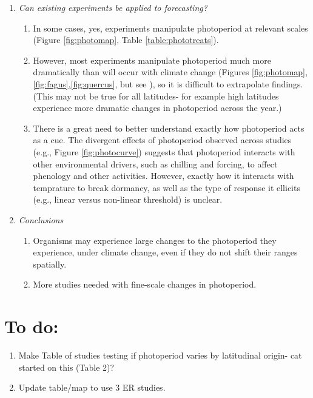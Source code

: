 \documentclass{article}
\begin{document}
\begin{enumerate}
\begin{enumerate}
\end{enumerate}
\item\textit{Can existing experiments be applied to forecasting?}
\begin{enumerate}
\item In some cases, yes, experiments manipulate photoperiod at relevant scales (Figure \ref{fig:photomap}, Table \ref{table:phototreats}).
\item However, most experiments manipulate photoperiod much more dramatically than will occur with climate change (Figures \ref{fig:photomap}, \ref{fig:fagus},\ref{fig:quercus}, but see \citep{Basler:2012}), so it is difficult to extrapolate findings. (This may not be true for all latitudes- for example high latitudes experience more dramatic changes in photoperiod across the year.)
\item There is a great need to better understand exactly how photoperiod acts as a cue. The divergent effects of photoperiod observed across studies (e.g., Figure \ref{fig:photocurve}) suggests that photoperiod interacts with other environmental drivers, such as chilling and forcing, to affect phenology and other activities. However, exactly how it interacts with temprature to break dormancy, as well as the type of response it ellicits (e.g., linear versus non-linear threshold) is unclear. 
\end{enumerate}
\item\textit{Conclusions}
\begin{enumerate}
\item Organisms may experience large changes to the photoperiod they experience, under climate change, even if they do not shift their ranges spatially.
\item More studies needed with fine-scale changes in photoperiod.
\end{enumerate}
\end{enumerate}

\section* {To do:}
\begin{enumerate}
\item Make Table of studies testing if photoperiod varies by latitudinal origin- cat started on this (Table 2)?
\item Update table/map to use 3 ER studies.
\end{enumerate}
\end{document}
